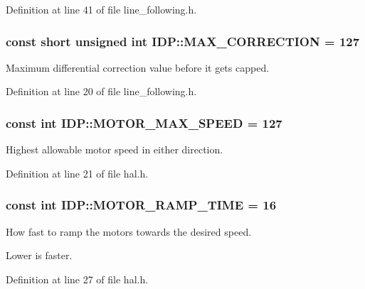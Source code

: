Definition at line 41 of file line\_\-following.h.

\hypertarget{namespaceIDP_a246919caaacabcb0399802d542d8330b}{
\subsubsection[{MAX\_\-CORRECTION}]{\setlength{\rightskip}{0pt plus 5cm}const short unsigned int {\bf IDP::MAX\_\-CORRECTION} = 127}}
\label{namespaceIDP_a246919caaacabcb0399802d542d8330b}


Maximum differential correction value before it gets capped. 



Definition at line 20 of file line\_\-following.h.

\hypertarget{namespaceIDP_a4ead0b21ad2c507b542445695182d4cd}{
\subsubsection[{MOTOR\_\-MAX\_\-SPEED}]{\setlength{\rightskip}{0pt plus 5cm}const int {\bf IDP::MOTOR\_\-MAX\_\-SPEED} = 127}}
\label{namespaceIDP_a4ead0b21ad2c507b542445695182d4cd}


Highest allowable motor speed in either direction. 



Definition at line 21 of file hal.h.

\hypertarget{namespaceIDP_ab3a00a6cc8a6dba271e38d337daf4703}{
\subsubsection[{MOTOR\_\-RAMP\_\-TIME}]{\setlength{\rightskip}{0pt plus 5cm}const int {\bf IDP::MOTOR\_\-RAMP\_\-TIME} = 16}}
\label{namespaceIDP_ab3a00a6cc8a6dba271e38d337daf4703}


How fast to ramp the motors towards the desired speed. 

Lower is faster. 

Definition at line 27 of file hal.h.

